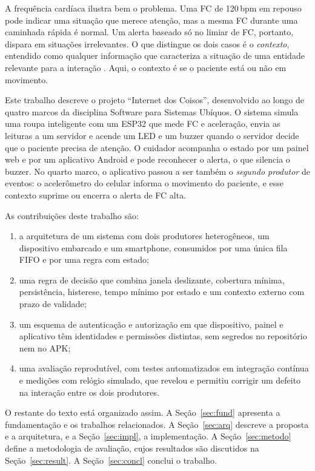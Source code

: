 \documentclass[12pt,a4paper]{article}
\begin{document}
A frequência cardíaca ilustra bem o problema.
Uma FC de 120\,bpm em repouso pode indicar uma situação que merece atenção, mas a mesma FC durante uma caminhada rápida é normal.
Um alerta baseado só no limiar de FC, portanto, dispara em situações irrelevantes.
O que distingue os dois casos é o \emph{contexto}, entendido como qualquer informação que caracteriza a situação de uma entidade relevante para a interação \cite{dey2001}.
Aqui, o contexto é se o paciente está ou não em movimento.

Este trabalho descreve o projeto ``Internet dos Coisos'', desenvolvido ao longo de quatro marcos da disciplina Software para Sistemas Ubíquos.
O sistema simula uma roupa inteligente com um ESP32 que mede FC e aceleração, envia as leituras a um servidor e acende um LED e um buzzer quando o servidor decide que o paciente precisa de atenção.
O cuidador acompanha o estado por um painel web e por um aplicativo Android e pode reconhecer o alerta, o que silencia o buzzer.
No quarto marco, o aplicativo passou a ser também o \emph{segundo produtor} de eventos: o acelerômetro do celular informa o movimento do paciente, e esse contexto suprime ou encerra o alerta de FC alta.

As contribuições deste trabalho são:
\begin{enumerate}
  \item a arquitetura de um sistema com dois produtores heterogêneos, um dispositivo embarcado e um smartphone, consumidos por uma única fila FIFO e por uma regra com estado;
  \item uma regra de decisão que combina janela deslizante, cobertura mínima, persistência, histerese, tempo mínimo por estado e um contexto externo com prazo de validade;
  \item um esquema de autenticação e autorização em que dispositivo, painel e aplicativo têm identidades e permissões distintas, sem segredos no repositório nem no APK;
  \item uma avaliação reprodutível, com testes automatizados em integração contínua e medições com relógio simulado, que revelou e permitiu corrigir um defeito na interação entre os dois produtores.
\end{enumerate}

O restante do texto está organizado assim.
A Seção~\ref{sec:fund} apresenta a fundamentação e os trabalhos relacionados.
A Seção~\ref{sec:arq} descreve a proposta e a arquitetura, e a Seção~\ref{sec:impl}, a implementação.
A Seção~\ref{sec:metodo} define a metodologia de avaliação, cujos resultados são discutidos na Seção~\ref{sec:result}.
A Seção~\ref{sec:concl} conclui o trabalho.
\end{document}
